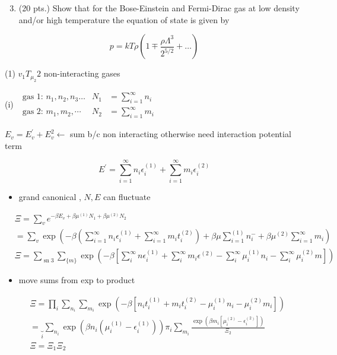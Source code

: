 \documentclass[10pt]{article}
\begin{document}
\begin{enumerate}
  \setcounter{enumi}{2}
  \item (20 pts.) Show that for the Bose-Einstein and Fermi-Dirac gas at low density and/or high temperature the equation of state is given by
\end{enumerate}


\begin{equation*}
p=k T \rho\left(1 \mp \frac{\rho \Lambda^{3}}{2^{5 / 2}}+\ldots\right) \tag{5}
\end{equation*}


(1) $v_{1} T_{\mu_{2}} 2$ non-interacting gases

(i) $\begin{aligned} \text { gas 1: } n_{1}, n_{2}, n_{3} \ldots & N_{1} & =\sum_{i=1}^{\infty} n_{i} \\ \text { gas 2: } m_{1}, m_{2}, \cdots & N_{2} & =\sum_{i=1}^{\infty} m_{i}\end{aligned}$

$E_{v}=E_{v}^{\prime}+E_{v}^{2} \longleftarrow$ sum b/c non interacting otherwise need interaction potential term

$$
E^{\prime}=\sum_{i=1}^{\infty} n_{i} \epsilon_{i}^{(1)}+\sum_{i=1}^{\infty} m_{i} \epsilon_{i}^{(2)}
$$

\begin{itemize}
  \item grand canonical , $N, E$ can fluctuate
\end{itemize}

$$
\begin{aligned}
& \Xi=\sum_{v} e^{-\beta E_{v}+\beta \mu^{(1)} N_{1}+\beta \mu^{(2)} N_{2}} \\
& =\sum_{v} \exp \left(-\beta\left(\sum_{i=1}^{\infty} n_{i} \epsilon_{i}^{(1)}+\sum_{i=1}^{\infty} m_{i} t_{i}^{(2)}\right)+\beta \mu \sum_{i=1}^{(1)} n_{i}^{-}+\beta \mu^{(2)} \sum_{i=1}^{\infty} m_{i}\right) \\
& \Xi=\sum_{\operatorname{sn} 3} \sum_{\{m\}} \exp \left(-\beta\left[\sum_{i}^{\infty} n \epsilon_{i}^{(1)}+\sum_{i}^{\infty} m_{i} \epsilon^{(2)}-\sum_{i}^{\infty} \mu_{i}^{(1)} n_{i}-\sum_{i}^{\infty} \mu_{i}^{(2)} m\right]\right)
\end{aligned}
$$

\begin{itemize}
  \item move sums from exp to product
\end{itemize}

$$
\begin{aligned}
& \Xi=\prod_{i} \sum_{n_{i}} \sum_{m_{i}} \exp \left(-\beta\left[n_{i} t_{i}^{(1)}+m_{i} t_{i}^{(2)}-\mu_{i}^{(1)} n_{i}-\mu_{i}^{(2)} m_{i}\right]\right) \\
& =\underbrace{}_{i} \sum_{n_{i}} \exp \left(\beta n_{i}\left(\mu_{i}^{(1)}-\epsilon_{i}^{(1)}\right)\right) \pi_{i} \sum_{m_{i}} \frac{\exp \left(\beta m_{i}\left[\mu_{i}^{(2)}-\epsilon_{i}^{(2)}\right]\right)}{\Xi_{2}} \\
& \Xi=\Xi_{1} \Xi_{2}
\end{aligned}
$$
\end{document}
